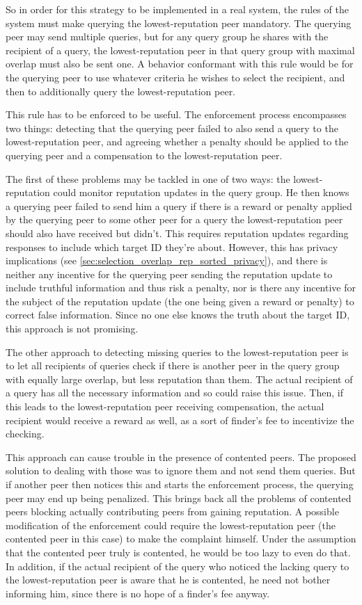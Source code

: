 So in order for this strategy to be implemented in a real system, the rules of
the system must make querying the lowest-reputation peer mandatory. The querying
peer may send multiple queries, but for any query group he shares with the
recipient of a query, the lowest-reputation peer in that query group with
maximal overlap must also be sent one. A behavior conformant with this rule
would be for the querying peer to use whatever criteria he wishes to select the
recipient, and then to additionally query the lowest-reputation peer.

This rule has to be enforced to be useful. The enforcement process encompasses
two things: detecting that the querying peer failed to also send a query to the
lowest-reputation peer, and agreeing whether a penalty should be applied to the
querying peer and a compensation to the lowest-reputation peer.

The first of these problems may be tackled in one of two ways: the
lowest-reputation could monitor reputation updates in the query group. He then
knows a querying peer failed to send him a query if there is a reward or penalty
applied by the querying peer to some other peer for a query the
lowest-reputation peer should also have received but didn't. This requires
reputation updates regarding responses to include which target ID they're about.
However, this has privacy implications (see
\ref{sec:selection_overlap_rep_sorted_privacy}), and there is neither any
incentive for the querying peer sending the reputation update to include
truthful information and thus risk a penalty, nor is there any incentive for the
subject of the reputation update (the one being given a reward or penalty) to
correct false information. Since no one else knows the truth about the target
ID, this approach is not promising.

The other approach to detecting missing queries to the lowest-reputation peer is
to let all recipients of queries check if there is another peer in the query
group with equally large overlap, but less reputation than them. The actual
recipient of a query has all the necessary information and so could raise this
issue. Then, if this leads to the lowest-reputation peer receiving compensation,
the actual recipient would receive a reward as well, as a sort of finder's fee
to incentivize the checking.

This approach can cause trouble in the presence of contented peers. The proposed
solution to dealing with those was to ignore them and not send them queries. But
if another peer then notices this and starts the enforcement process, the
querying peer may end up being penalized. This brings back all the problems of
contented peers blocking actually contributing peers from gaining reputation. A
possible modification of the enforcement could require the lowest-reputation
peer (the contented peer in this case) to make the complaint himself. Under the
assumption that the contented peer truly is contented, he would be too lazy to
even do that. In addition, if the actual recipient of the query who noticed the
lacking query to the lowest-reputation peer is aware that he is contented, he
need not bother informing him, since there is no hope of a finder's fee anyway.

